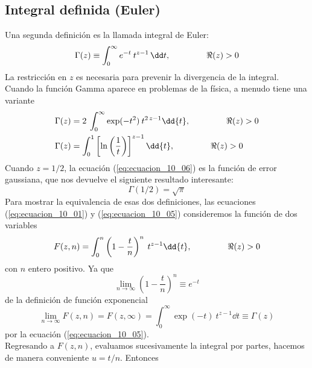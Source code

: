 \subsection{Integral definida (Euler)}
Una segunda definición es la llamada integral de Euler:
\begin{equation}
\Gamma (z) \equiv \int_{0}^{\infty} e^{-t} \: t^{z - 1} \, \dd t, \hspace{1.5cm} \Re(z) > 0
\label{eq:ecuacion_10_05}
\end{equation}
La restricción en $z$ es necesaria para prevenir la divergencia de la integral. Cuando la función Gamma aparece en problemas de la física, a menudo tiene una variante
\begin{align}
\Gamma (z) &= 2 \: \int_{0}^{\infty} \exp(-t^{2}) \: t^{2 \, z - 1} \dd{t}, \hspace{1.5cm} \Re(z) > 0  \label{eq:ecuacion_10_06} \\
\Gamma (z) &=  \int_{0}^{1} \left[ \ln\left(\dfrac{1}{t} \right) \right]^{z - 1} \dd{t}, \hspace{1.5cm} \Re (z) > 0 \label{eq:ecuacion_10_07}
\end{align}
Cuando $z=1/2$, la ecuación (\ref{eq:ecuacion_10_06}) es la función de error gaussiana, que nos devuelve el siguiente resultado interesante:
\begin{equation}
\Gamma (1/2) = \sqrt{\pi}
\label{eq:ecuacion_10_08}
\end{equation}
Para mostrar la equivalencia de esas dos definiciones, las ecuaciones (\ref{eq:ecuacion_10_01}) y (\ref{eq:ecuacion_10_05}) consideremos la función de dos variables
\begin{equation}
F(z, n) = \int_{0}^{n} \left( 1 - \dfrac{t}{n} \right)^{n} \: t^{z - 1} \dd{t}, \hspace{1.5cm} \Re(z) > 0
\label{eq:ecuacion_10_09}
\end{equation}
con $n$ entero positivo. Ya que
\begin{equation}
\lim_{n \to \infty} \left( 1 - \dfrac{t}{n} \right)^{n} \equiv e^{-t}
\label{eq:ecuacion_10_10}
\end{equation}
de la definición de función exponencial
\begin{equation}
\lim_{n \to \infty} F(z, n) = F(z, \infty) = \int_{0}^{\infty} \exp(-t) \: t^{z - 1} \dd{t} \equiv \Gamma (z)
\label{eq:ecuacion_10_11}
\end{equation}
por la ecuación (\ref{eq:ecuacion_10_05}).
\\
Regresando a $F(z,n)$, evaluamos sucesivamente la integral por partes, hacemos de manera conveniente $u = t/n$. Entonces

